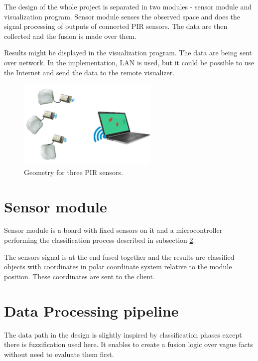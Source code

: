 The design of the whole project is separated in two modules - sensor module
and visualization program. Sensor module senses the observed space and does the
signal processing of outputs of connected PIR sensors. The data are then collected
and the fusion is made over them.

Results might be displayed in the visualization program. The data are being sent
over network. In the implementation, LAN is used, but it could be possible to
use the Internet and send the data to the remote visualizer.

\begin{figure}[h!]
\begin{center}
\includegraphics[width=0.6\textwidth]{obrazky-figures/design.png}
\caption{Geometry for three PIR sensors.\label{fig:design}}
\end{center}
\end{figure}

\section{Sensor module}

Sensor module is a board with fixed sensors on it and a microcontroller performing the
classification process described in subsection \ref{label:dataprocessing}.

The sensors signal is at the end fused together and the results are classified objects
with coordinates in polar coordinate system relative to the module position. These
coordinates are sent to the client.


\section{Data Processing pipeline}
\label{label:dataprocessing}

The data path in the design is slightly inspired by classification phases except
there is fuzzification used here. It enables to create a fusion logic over vague
facts without need to evaluate them first.

